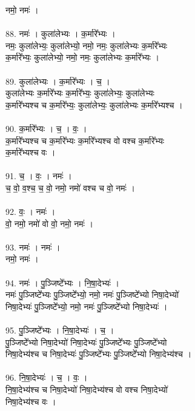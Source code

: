 नमो॒ नमः॑ ।\\
\\
88. नमः॑ । कुला॑लेभ्यः । क॒र्मारे᳚भ्यः ।\\
नमः॒ कुला॑लेभ्यः॒ कुला॑लेभ्यो॒ नमो॒ नमः॒ कुला॑लेभ्यः क॒र्मारे᳚भ्यः\\
क॒र्मारे᳚भ्यः॒ कुला॑लेभ्यो॒ नमो॒ नमः॒ कुला॑लेभ्यः क॒र्मारे᳚भ्यः ।\\
\\
89. कुला॑लेभ्यः । क॒र्मारे᳚भ्यः । च॒ ।\\
कुला॑लेभ्यः क॒र्मारे᳚भ्यः क॒र्मारे᳚भ्यः॒ कुला॑लेभ्यः॒ कुला॑लेभ्यः\\
क॒र्मारे᳚भ्यश्च च क॒र्मारे᳚भ्यः॒ कुला॑लेभ्यः॒ कुला॑लेभ्यः क॒र्मारे᳚भ्यश्च ।\\
\\
90. क॒र्मारे᳚भ्यः । च॒ । वः॒ ।\\
क॒र्मारे᳚भ्यश्च च क॒र्मारे᳚भ्यः क॒र्मारे᳚भ्यश्च वो वश्च क॒र्मारे᳚भ्यः\\
क॒र्मारे᳚भ्यश्च वः ।\\
\\
91. च॒ । वः॒ । नमः॑ ।\\
च॒ वो॒ व॒श्च॒ च॒ वो॒ नमो॒ नमो॑ वश्च च वो॒ नमः॑ ।\\
\\
92. वः॒ । नमः॑ ।\\
वो॒ नमो॒ नमो॑ वो वो॒ नमो॒ नमः॑ ।\\
\\
93. नमः॑ । नमः॑ ।\\
नमो॒ नमः॑ ।\\
\\
94. नमः॑ । पु॒ञ्जिष्टे᳚भ्यः । नि॒षा॒देभ्यः॑ ।\\
नमः॑ पु॒ञ्जिष्टे᳚भ्यः पु॒ञ्जिष्टे᳚भ्यो॒ नमो॒ नमः॑ पु॒ञ्जिष्टे᳚भ्यो निषा॒देभ्यो॑\\
निषा॒देभ्यः॑ पु॒ञ्जिष्टे᳚भ्यो॒ नमो॒ नमः॑ पु॒ञ्जिष्टे᳚भ्यो निषा॒देभ्यः॑ ।\\
\\
95. पु॒ञ्जिष्टे᳚भ्यः । नि॒षा॒देभ्यः॑ । च॒ ।\\
पु॒ञ्जिष्टे᳚भ्यो निषा॒देभ्यो॑ निषा॒देभ्यः॑ पु॒ञ्जिष्टे᳚भ्यः पु॒ञ्जिष्टे᳚भ्यो\\
निषा॒देभ्य॑श्च च निषा॒देभ्यः॑ पु॒ञ्जिष्टे᳚भ्यः पु॒ञ्जिष्टे᳚भ्यो निषा॒देभ्य॑श्च ।\\
\\
96. नि॒षा॒देभ्यः॑ । च॒ । वः॒ ।\\
नि॒षा॒देभ्य॑श्च च निषा॒देभ्यो॑ निषा॒देभ्य॑श्च वो वश्च निषा॒देभ्यो॑\\
निषा॒देभ्य॑श्च वः ।\\
\\
